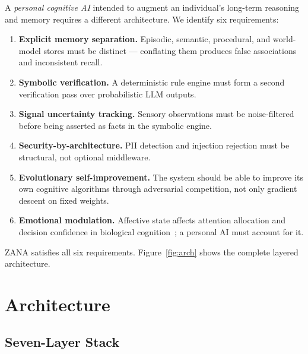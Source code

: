 \documentclass[12pt,a4paper]{article}
\begin{document}
A \emph{personal cognitive AI} intended to augment an individual's long-term reasoning and memory
requires a different architecture. We identify six requirements:

\begin{enumerate}[leftmargin=*, label=\textbf{R\arabic*.}]
  \item \textbf{Explicit memory separation.} Episodic, semantic, procedural, and world-model stores must
    be distinct --- conflating them produces false associations and inconsistent recall.
  \item \textbf{Symbolic verification.} A deterministic rule engine must form a second verification pass
    over probabilistic LLM outputs.
  \item \textbf{Signal uncertainty tracking.} Sensory observations must be noise-filtered before being
    asserted as facts in the symbolic engine.
  \item \textbf{Security-by-architecture.} PII detection and injection rejection must be structural, not
    optional middleware.
  \item \textbf{Evolutionary self-improvement.} The system should be able to improve its own cognitive
    algorithms through adversarial competition, not only gradient descent on fixed weights.
  \item \textbf{Emotional modulation.} Affective state affects attention allocation and decision
    confidence in biological cognition~\cite{bates1994emotion}; a personal AI must account for it.
\end{enumerate}

ZANA satisfies all six requirements. Figure~\ref{fig:arch} shows the complete layered architecture.

\section{Architecture}
\label{sec:arch}

\subsection{Seven-Layer Stack}
\end{document}
